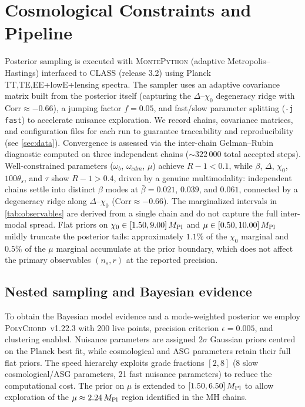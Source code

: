 \documentclass[11pt,a4paper]{article}
\begin{document}
\section{Cosmological Constraints and Pipeline}
\label{sec:constraints}
Posterior sampling is executed with \textsc{MontePython} (adaptive Metropolis--Hastings) interfaced to \textsc{CLASS} (release 3.2) using Planck TT,TE,EE+lowE+lensing spectra. The sampler uses an adaptive covariance matrix built from the posterior itself (capturing the $\Delta$--$\chi_0$ degeneracy ridge with $\mathrm{Corr}\approx-0.66$), a jumping factor $f=0.05$, and fast/slow parameter splitting (\texttt{-j fast}) to accelerate nuisance exploration. We record chains, covariance matrices, and configuration files for each run to guarantee traceability and reproducibility (see \cref{sec:data}). Convergence is assessed via the inter-chain Gelman--Rubin diagnostic computed on three independent chains (${\sim}322\,000$ total accepted steps). Well-constrained parameters ($\omega_b$, $\omega_{cdm}$, $\mu$) achieve $R{-}1<0.1$, while $\beta$, $\Delta$, $\chi_0$, $100\theta_s$, and $\tau$ show $R{-}1>0.4$, driven by a genuine multimodality: independent chains settle into distinct $\beta$ modes at $\bar\beta=0.021$, $0.039$, and $0.061$, connected by a degeneracy ridge along $\Delta$--$\chi_0$ ($\mathrm{Corr}\approx-0.66$). The marginalized intervals in \cref{tab:observables} are derived from a single chain and do not capture the full inter-modal spread. Flat priors on $\chi_0\in[1.50,9.00]\,M_{\rm Pl}$ and $\mu\in[0.50,10.00]\,M_{\rm Pl}$ mildly truncate the posterior tails: approximately $1.1\%$ of the $\chi_0$ marginal and $0.5\%$ of the $\mu$ marginal accumulate at the prior boundary, which does not affect the primary observables $(n_s,r)$ at the reported precision.

\subsection{Nested sampling and Bayesian evidence}
\label{sec:evidence}
To obtain the Bayesian model evidence and a mode-weighted posterior we employ \textsc{PolyChord}~v1.22.3 \cite{Handley2015a,Handley2015b} with 200 live points, precision criterion $\epsilon=0.005$, and clustering enabled. Nuisance parameters are assigned $2\sigma$ Gaussian priors centred on the Planck best fit, while cosmological and ASG parameters retain their full flat priors. The speed hierarchy exploits grade fractions $[2,8]$ (8 slow cosmological/ASG parameters, 21 fast nuisance parameters) to reduce the computational cost. The prior on $\mu$ is extended to $[1.50,6.50]\,M_{\rm Pl}$ to allow exploration of the $\mu\approx2.24\,M_{\rm Pl}$ region identified in the MH chains.
\end{document}
